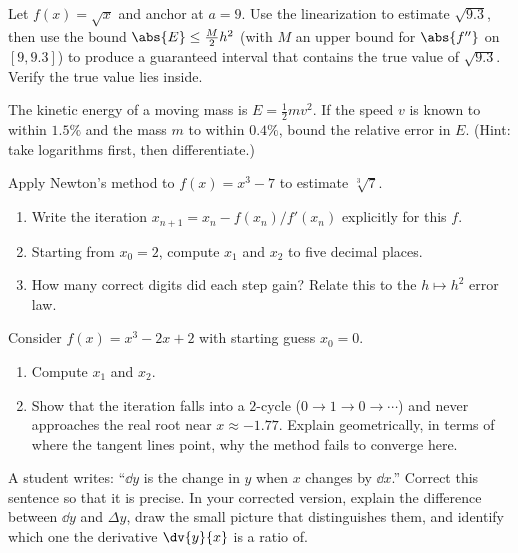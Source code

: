 \begin{exercise}
Let $f(x) = \sqrt{x}$ and anchor at $a=9$. Use the linearization to estimate
$\sqrt{9.3}$, then use the bound $\abs{E}\le \tfrac{M}{2}h^2$ (with $M$ an upper
bound for $\abs{f''}$ on $[9,9.3]$) to produce a guaranteed interval that
contains the true value of $\sqrt{9.3}$. Verify the true value lies inside.
\end{exercise}

\begin{exercise}
The kinetic energy of a moving mass is $E = \tfrac12 m v^2$. If the speed $v$ is
known to within $1.5\%$ and the mass $m$ to within $0.4\%$, bound the relative
error in $E$. (Hint: take logarithms first, then differentiate.)
\end{exercise}

\begin{exercise}
Apply Newton's method to $f(x) = x^3 - 7$ to estimate $\sqrt[3]{7}$.
\begin{enumerate}
\item Write the iteration $x_{n+1} = x_n - f(x_n)/f'(x_n)$ explicitly for this
$f$.
\item Starting from $x_0 = 2$, compute $x_1$ and $x_2$ to five decimal places.
\item How many correct digits did each step gain? Relate this to the
$h\mapsto h^2$ error law.
\end{enumerate}
\end{exercise}

\begin{exercise}
Consider $f(x) = x^3 - 2x + 2$ with starting guess $x_0 = 0$.
\begin{enumerate}
\item Compute $x_1$ and $x_2$.
\item Show that the iteration falls into a $2$-cycle ($0 \to 1 \to 0 \to \cdots$)
and never approaches the real root near $x\approx -1.77$. Explain geometrically,
in terms of where the tangent lines point, why the method fails to converge here.
\end{enumerate}
\end{exercise}

\begin{exercise}
A student writes: ``$\dd y$ is the change in $y$ when $x$ changes by $\dd x$.''
Correct this sentence so that it is precise. In your corrected version, explain
the difference between $\dd y$ and $\Delta y$, draw the small picture that
distinguishes them, and identify which one the derivative $\dv{y}{x}$ is a ratio
of.
\end{exercise}

